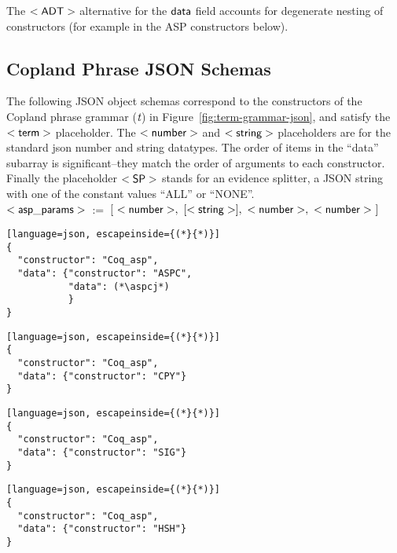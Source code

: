\noindent The $\mathsf{<ADT>}$ alternative for the $\mathsf{data}$ field accounts for
degenerate nesting of constructors (for example in the ASP constructors below).


\subsection{Copland Phrase JSON Schemas}
The following JSON object schemas correspond to the constructors of
the Copland phrase grammar ($\mathsf{\emph{t}}$) in
Figure~\ref{fig:term-grammar-json}, and satisfy the $\mathsf{<term>}$ placeholder.
The $\mathsf{<number>}$ and $\mathsf{<string>}$ placeholders are for the standard json number
and string datatypes.  The order of items in the ``data'' subarray is
significant--they match the order of arguments to each constructor.
Finally the placeholder $\mathsf{<SP>}$ stands for an evidence splitter, a JSON
string with one of the constant values ``ALL'' or ``NONE''. \\


\noindent $\mathsf{<asp\_params>}$~:=~$[~\mathsf{<number>},~[\mathsf{<string>}],~\mathsf{<number>},~\mathsf{<number>}~]$ \\

\begin{lstlisting}[language=json, escapeinside={(*}{*)}]
{
  "constructor": "Coq_asp",
  "data": {"constructor": "ASPC",
           "data": (*\aspcj*)
           }
}
\end{lstlisting}


\begin{lstlisting}[language=json, escapeinside={(*}{*)}]
{
  "constructor": "Coq_asp",
  "data": {"constructor": "CPY"}
}
\end{lstlisting}

\begin{lstlisting}[language=json, escapeinside={(*}{*)}]
{
  "constructor": "Coq_asp",
  "data": {"constructor": "SIG"}
}
\end{lstlisting}

\begin{lstlisting}[language=json, escapeinside={(*}{*)}]
{
  "constructor": "Coq_asp",
  "data": {"constructor": "HSH"}
}
\end{lstlisting}

